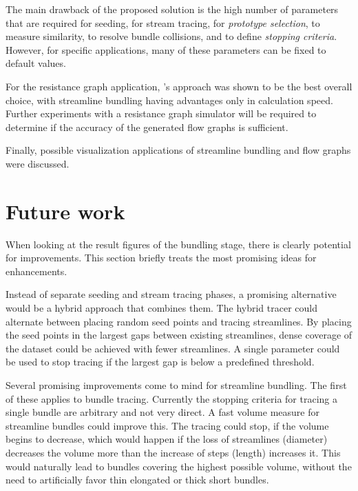The main drawback of the proposed solution is the high number of parameters that are required for seeding, for stream tracing, for \emph{prototype selection}, to measure similarity, to resolve bundle collisions, and to define \emph{stopping criteria}. However, for specific applications, many of these parameters can be fixed to default values.

For the resistance graph application, 's approach was shown to be the best overall choice, with streamline bundling having advantages only in calculation speed. Further experiments with a resistance graph simulator will be required to determine if the accuracy of the generated flow graphs is sufficient.

Finally, possible visualization applications of streamline bundling and flow graphs were discussed.


\section{Future work}
\label{sec:futur}

When looking at the result figures of the bundling stage, there is clearly potential for improvements. This section briefly treats the most promising ideas for enhancements.

Instead of separate seeding and stream tracing phases, a promising alternative would be a hybrid approach that combines them. The hybrid tracer could alternate between placing random seed points and tracing streamlines. By placing the seed points in the largest gaps between existing streamlines, dense coverage of the dataset could be achieved with fewer streamlines. A single parameter could be used to stop tracing if the largest gap is below a predefined threshold.

Several promising improvements come to mind for streamline bundling.
The first of these applies to bundle tracing. Currently the stopping criteria for tracing a single bundle are arbitrary and not very direct. A fast volume measure for streamline bundles could improve this. The tracing could stop, if the volume begins to decrease, which would happen if the loss of streamlines (diameter) decreases the volume more than the increase of steps (length) increases it. This would naturally lead to bundles covering the highest possible volume, without the need to artificially favor thin elongated or thick short bundles.

